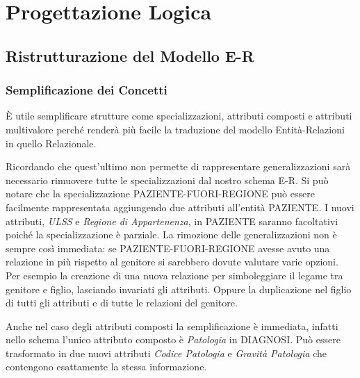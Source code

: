 \documentclass{article}
\begin{document}




\clearpage
\section{Progettazione Logica}


\subsection{Ristrutturazione del Modello E-R}
\subsubsection{Semplificazione dei Concetti}

È utile semplificare strutture come specializzazioni, attributi composti e attributi multivalore perché renderà più facile la traduzione del modello Entità-Relazioni in quello Relazionale.

Ricordando che quest'ultimo non permette di rappresentare generalizzazioni sarà necessario rimuovere tutte le specializzazioni dal nostro schema E-R.
Si può notare che la specializzazione PAZIENTE-FUORI-REGIONE può essere facilmente rappresentata aggiungendo due attributi all'entità PAZIENTE.
I nuovi attributi, \textit{ULSS} e \textit{Regione di Appartenenza}, in PAZIENTE saranno facoltativi poiché la specializzazione è parziale.
La rimozione delle generalizzazioni non è sempre così immediata: se PAZIENTE-FUORI-REGIONE avesse avuto una relazione in più rispetto al genitore si sarebbero dovute valutare varie opzioni.
Per esempio la creazione di una nuova relazione per simboleggiare il legame tra genitore e figlio, lasciando invariati gli attributi.
Oppure la duplicazione nel figlio di tutti gli attributi e di tutte le relazioni del genitore.

Anche nel caso degli attributi composti la semplificazione è immediata, infatti nello schema l'unico attributo composto è \textit{Patologia} in DIAGNOSI.
Può essere trasformato in due nuovi attributi \textit{Codice Patologia} e \textit{Gravità Patologia} che contengono esattamente la stessa informazione.
\end{document}
